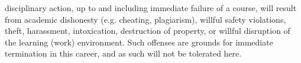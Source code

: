 \vskip 10pt

\noindent
{} disciplinary action, up to and including immediate failure of a course, will result from academic dishonesty (e.g. cheating, plagiarism), willful safety violations, theft, harassment, intoxication, destruction of property, or willful disruption of the learning (work) environment.  Such offenses are grounds for immediate termination in this career, and as such will not be tolerated here.



\vfil

\eject

